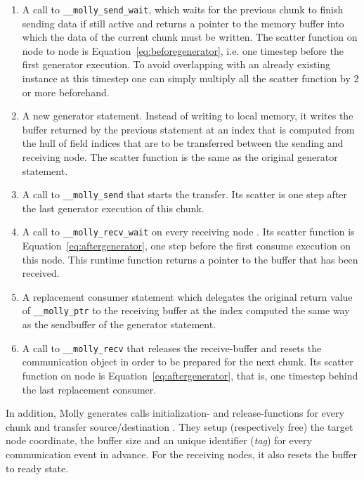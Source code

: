 \documentclass{sigplanconf}
\begin{document}
\begin{enumerate}
\item A call to \texttt{\_\_molly\_send\_wait}, which waits for the previous chunk to finish sending data if still active and returns a pointer to the memory buffer into which the data of the current chunk must be written. The scatter function on node  to node  is Equation~\ref{eq:beforegenerator}, i.e. one timestep before the first generator execution. To avoid overlapping with an already existing instance at this timestep one can simply multiply all the scatter function by 2 or more beforehand.

\item A new generator statement. Instead of writing to local memory, it writes the buffer returned by the previous statement at an index that is computed from the hull of field indices that are to be transferred between the sending and receiving node. The scatter function is the same as the original generator statement.

\item A call to \texttt{\_\_molly\_send} that starts the transfer. Its scatter is one step after the last generator execution of this chunk.

\item A call to \texttt{\_\_molly\_recv\_wait} on every receiving node . Its scatter function is Equation~\ref{eq:aftergenerator}, one step before the first consume execution on this node. This runtime function returns a pointer to the buffer that has been received.

\item A replacement consumer statement which delegates the original return value of \texttt{\_\_molly\_ptr} to the receiving buffer at the index computed the same way as the sendbuffer of the generator statement.

\item A call to \texttt{\_\_molly\_recv} that releases the receive-buffer and resets the communication object in order to be prepared for the next chunk. Its scatter function on node is Equation~\ref{eq:aftergenerator}, that is, one timestep behind the last replacement consumer.

\end{enumerate} 

In addition, Molly generates calls initialization- and release-functions for every chunk and transfer source/destination 
. They setup (respectively free) the target node coordinate, the buffer size and an unique identifier (\emph{tag}) for every communication event in advance. For the receiving nodes, it also resets the buffer to ready state.
\end{document}
